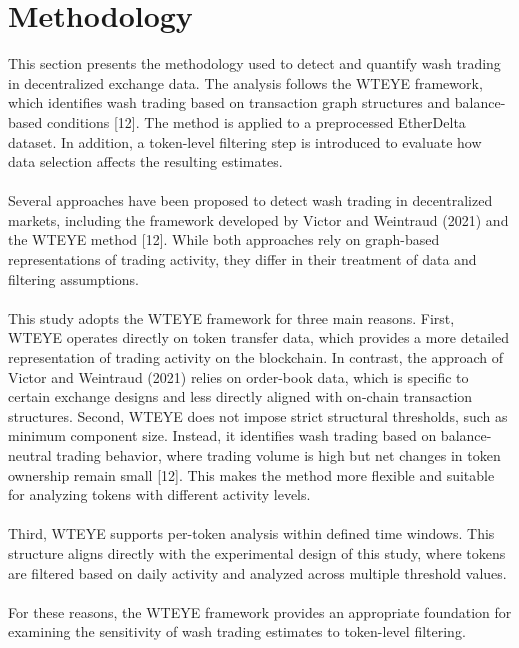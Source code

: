 \documentclass[language=english,thesis=bachelor,nosecondtitle,faculty=cb,onesided,12pt]{hsmw-thesis}
\begin{document}
		

	\chapter{Methodology}

This section presents the methodology used to detect and quantify wash trading in decentralized exchange data. The analysis follows the WTEYE framework, which identifies wash trading based on transaction graph structures and balance-based conditions [12]. The method is applied to a preprocessed EtherDelta dataset. In addition, a token-level filtering step is introduced to evaluate how data selection affects the resulting estimates.\\
\\
Several approaches have been proposed to detect wash trading in decentralized markets, including the framework developed by Victor and Weintraud (2021) and the WTEYE method [12]. While both approaches rely on graph-based representations of trading activity, they differ in their treatment of data and filtering assumptions.\\
\\
This study adopts the WTEYE framework for three main reasons. First, WTEYE operates directly on token transfer data, which provides a more detailed representation of trading activity on the blockchain. In contrast, the approach of Victor and Weintraud (2021) relies on order-book data, which is specific to certain exchange designs and less directly aligned with on-chain transaction structures.
Second, WTEYE does not impose strict structural thresholds, such as minimum component size. Instead, it identifies wash trading based on balance-neutral trading behavior, where trading volume is high but net changes in token ownership remain small [12]. This makes the method more flexible and suitable for analyzing tokens with different activity levels.\\
\\
Third, WTEYE supports per-token analysis within defined time windows. This structure aligns directly with the experimental design of this study, where tokens are filtered based on daily activity and analyzed across multiple threshold values.\\
\\
For these reasons, the WTEYE framework provides an appropriate foundation for examining the sensitivity of wash trading estimates to token-level filtering.\\
\\
\end{document}
